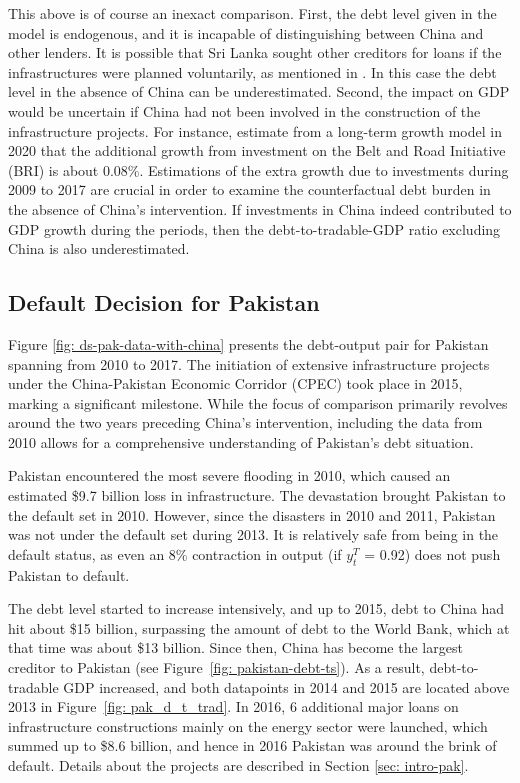 This above is of course an inexact comparison.
First, the debt level given in the model is endogenous, and it is incapable of distinguishing between China and other lenders. It is possible that Sri Lanka sought other creditors for loans if the infrastructures were planned voluntarily, as mentioned in \citet{Brautigam-meme-2020}. In this case the debt level in the absence of China can be underestimated.
Second, the impact on GDP would be uncertain if China had not been involved in the construction of the infrastructure projects. For instance, \citet{Bandiera-Vasileios-BRI-debt} estimate from a long-term growth model in 2020 that the additional growth from investment on the Belt and Road Initiative (BRI) is about 0.08\%.
Estimations of the extra growth due to investments during 2009 to 2017 are crucial in order to examine the counterfactual debt burden in the absence of China's intervention. If investments in China indeed contributed to GDP growth during the periods, then the debt-to-tradable-GDP ratio excluding China is also underestimated.

\subsection{Default Decision for Pakistan}

Figure \ref{fig: ds-pak-data-with-china} presents the debt-output pair for Pakistan spanning from 2010 to 2017. The initiation of extensive infrastructure projects under the China-Pakistan Economic Corridor (CPEC) took place in 2015, marking a significant milestone. While the focus of comparison primarily revolves around the two years preceding China's intervention, including the data from 2010 allows for a comprehensive understanding of Pakistan's debt situation.

Pakistan encountered the most severe flooding in 2010, which caused an estimated \$9.7 billion loss in infrastructure. The devastation brought Pakistan to the default set in 2010.
However, since the disasters in 2010 and 2011, Pakistan was not under the default set during 2013. It is relatively safe from being in the default status, as even an 8\% contraction in output (if $y^T_t$ = 0.92) does not push Pakistan to default.

The debt level started to increase intensively, and up to 2015, debt to China had hit about \$15 billion, surpassing the amount of debt to the World Bank, which at that time was about \$13 billion. Since then, China has become the largest creditor to Pakistan (see Figure~\ref{fig: pakistan-debt-ts}). As a result, debt-to-tradable GDP increased, and both datapoints in 2014 and 2015 are located above 2013 in Figure~\ref{fig: pak_d_t_trad}. In 2016, 6 additional major loans on infrastructure constructions mainly on the energy sector were launched, which summed up to \$8.6 billion, and hence in 2016 Pakistan was around the brink of default. Details about the projects are described in Section \ref{sec: intro-pak}.

